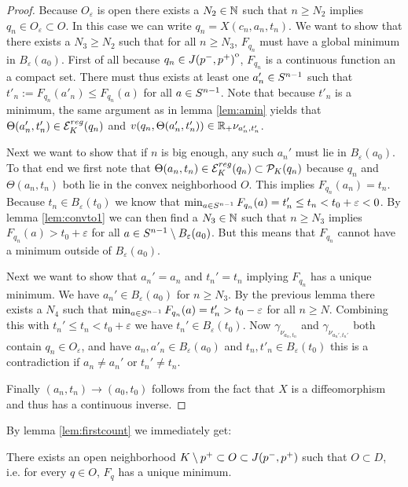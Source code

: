 \begin{proof}
    Because $O_\varepsilon$ is open there exists a $N_2\in \mathbb{N}$ such that $n\ge N_2$ implies $q_n\in O_\varepsilon\subset O$.
    In this case we can write $q_n = X(c_n,a_n,t_n)$. We want to show that there exists a $N_3\ge N_2$ such that for all $n\ge N_3$, $F_{q_n}$ must have a global minimum in $B_\varepsilon(a_0)$. First of all because $q_n \in {\kern0ptJ(p^-,p^+)}^{\mathrm{o}}$, $F_{q_n}$ is a continuous function an a compact set. There must thus exists at least one $a'_n\in {S^{n-1}}$ such that $t'_n := F_{q_n}(a'_n) \leq F_{q_n}(a)$ for all $a\in {S^{n-1}}$. Note that because $t'_n$ is a minimum, the same argument as in lemma \ref{lem:amin} yields that $\Theta(a'_n,t_n')\in {{\mathcal{E}}^{reg}_K}(q_n)$ and $v(q_n,\Theta(a'_n,t_n')) \in \mathbb{R}_+\nu_{a_n',t_n'}$.
    
    Next we want to show that if $n$ is big enough, any such $a_n'$ must lie in $B_\varepsilon(a_0)$. 
    To that end we first note that  $\Theta(a_n,t_n)\in {{\mathcal{E}}^{reg}_K}(q_n)\subset {\mathcal{P}}_K(q_n)$ because $q_n$ and $\Theta(a_n,t_n)$ both lie in the convex neighborhood $O$. 
    This implies $F_{q_n}(a_n)=t_n$. 
    Because $t_n\in B_\varepsilon(t_0)$ we know that $\min_{a\in {S^{n-1}}}F_{q_n}(a) = t'_n\leq t_n < t_0+\varepsilon < 0$. 
    By lemma \ref{lem:convto1} we can then find a $N_3\in \mathbb{N}$ such that $n\ge N_3$ implies $F_{q_n}(a)>t_0+\varepsilon$ for all $a\in {S^{n-1}} \setminus B_\varepsilon(a_0)$. But this means that $F_{q_n}$ cannot have a minimum outside of $B_\varepsilon(a_0)$.

    Next we want to show that $a_n'=a_n$ and $t_n'=t_n$ implying $F_{q_n}$ has a unique minimum.
    We have $a_n'\in B_\varepsilon(a_0)$ for $n\ge N_3$. By the previous lemma there exists a $N_4$ such that $\min_{a\in {S^{n-1}}} F_{q_n}(a)=t'_n> t_0-\varepsilon$ for all $n\ge N$. Combining this with $t_n'\leq t_n < t_0+\varepsilon$ we have $t_n'\in B_\varepsilon(t_0)$. Now $\gamma_{\nu_{a_n,t_n}}$ and $\gamma_{\nu_{a_n',t_n'}}$ both contain $q_n\in O_\varepsilon$, and have $a_n,a'_n\in B_\varepsilon(a_0)$ and $t_n,t'_n\in B_\varepsilon(t_0)$ this is a contradiction if $a_n\neq a_n'$ or $t_n'\neq t_n$. 

    Finally $(a_n,t_n)\to (a_0,t_0)$ follows from the fact that $X$ is a diffeomorphism and thus has a continuous inverse.
\end{proof}

By lemma \ref{lem:firstcount} we immediately get:
\begin{corollary}
    There exists an open neighborhood $K\setminus p^+\subset O\subset J(p^-,p^+)$ such that $O\subset D$, i.e. for every $q\in O$, $F_q$ has a unique minimum.
\end{corollary}


